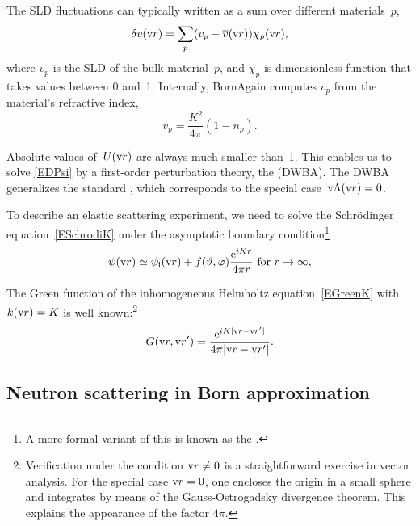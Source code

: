 The SLD fluctuations can typically written as a sum over different materials~$p$,
\begin{equation}
  \delta v(\text{v}{r}) = \sum_p (v_p-\overline{v}(\text{v}{r})) \chi_p(\text{v}{r}),
\end{equation}
where $v_p$ is the SLD of the bulk material~$p$,
and $\chi_p$ is dimensionless function that takes values between 0 and~1.
Internally, BornAgain computes $v_p$ from the material's refractive index,
\begin{equation}
  v_p = \frac{K^2}{4\pi}(1-n_p).
\end{equation}

Absolute values of~$U(\text{v}{r})$ are always much smaller than~1.
This enables us to solve \cref{EDPsi} by a first-order perturbation theory,
%
the  (DWBA).
%
The DWBA generalizes the standard ,
%
which corresponds to the special case~$\text{v}\Lambda(\text{v}{r})=0$.

To describe an elastic scattering experiment,
we need to solve the Schrödinger equation~\cref{ESchrodiK}
under the asymptotic boundary condition\footnote
{A more formal variant of this is known as the .%
%
%
}
%
\begin{equation}\label{Escabouco}
  \psi(\text{v}{r})
  \simeq \psi_{\text{i}}(\text{v}{r}) + f(\vartheta,\varphi)\frac{\mathrm e^{iKr}}{4\pi r}
  \text{~for~}r\to\infty,
\end{equation}

The Green function of the inhomogeneous Helmholtz equation~\cref{EGreenK}
with $k(\text{v}{r})=K$ is well known:\footnote
{Verification under the condition $\text{v}{r}\ne0$
is a straightforward exercise in vector analysis.
For the special case $\text{v}{r}=0$,
one encloses the origin in a small sphere
and integrates by means of the Gauss-Ostrogadsky divergence theorem.
This explains the appearance of the factor $4\pi$.}
%
\begin{equation}\label{EGreens1}
  G(\text{v}{r},\text{v}{r}') = \frac{\mathrm e^{iK|\text{v}{r}-\text{v}{r}'|}}{4\pi |\text{v}{r}-\text{v}{r}'|}.
\end{equation}

\subsection{Neutron scattering in Born approximation}\label{SBornApprox}

